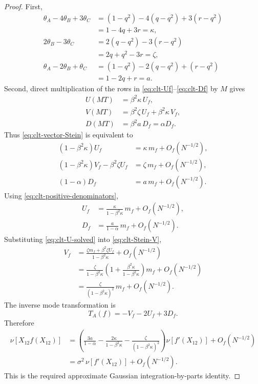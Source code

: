 \begin{proof}
First,
\begin{align*}
 \theta_A-4\theta_B+3\theta_C
 &=
 (1-q^2)-4(q-q^2)+3(r-q^2)\\
 &=1-4q+3r
 =\kappa,
\\
 2\theta_B-3\theta_C
 &=
 2(q-q^2)-3(r-q^2)\\
 &=2q+q^2-3r
 =\zeta,
\\
 \theta_A-2\theta_B+\theta_C
 &=
 (1-q^2)-2(q-q^2)+(r-q^2)\\
 &=1-2q+r
 =a.
\end{align*}
Second, direct multiplication of the rows in
\eqref{eq:clt-Uf}--\eqref{eq:clt-Df} by $M$ gives
\begin{align*}
 U(MT)
 &=\beta^2\kappa\,U_f,\\
 V(MT)
 &=\beta^2\zeta\,U_f+\beta^2\kappa\,V_f,\\
 D(MT)
 &=\beta^2a\,D_f
 =\alpha D_f.
\end{align*}
Thus \eqref{eq:clt-vector-Stein} is equivalent to
\begin{align}
 (1-\beta^2\kappa)U_f
 &=
 \kappa\,m_f+O_f(N^{-1/2}),
 \label{eq:clt-Stein-U}\\
 (1-\beta^2\kappa)V_f-\beta^2\zeta U_f
 &=
 \zeta\,m_f+O_f(N^{-1/2}),
 \label{eq:clt-Stein-V}\\
 (1-\alpha)D_f
 &=
 a\,m_f+O_f(N^{-1/2}).
 \label{eq:clt-Stein-D}
\end{align}
Using \eqref{eq:clt-positive-denominators},
\begin{align}
 U_f
 &=
 \frac{\kappa}{1-\beta^2\kappa}\,m_f
 +O_f(N^{-1/2}),
 \label{eq:clt-U-solved}\\
 D_f
 &=
 \frac{a}{1-\alpha}\,m_f
 +O_f(N^{-1/2}).
 \label{eq:clt-D-solved}
\end{align}
Substituting \eqref{eq:clt-U-solved} into
\eqref{eq:clt-Stein-V},
\begin{align*}
 V_f
 &=
 \frac{
 \zeta m_f+\beta^2\zeta U_f
 }{1-\beta^2\kappa}
 +O_f(N^{-1/2})
\\
 &=
 \frac{\zeta}{1-\beta^2\kappa}
 \left(
 1+
 \frac{\beta^2\kappa}{1-\beta^2\kappa}
 \right)m_f
 +O_f(N^{-1/2})
\\
 &=
 \frac{\zeta}{(1-\beta^2\kappa)^2}\,m_f
 +O_f(N^{-1/2}).
 \label{eq:clt-V-solved}
\end{align*}
The inverse mode transformation is
\begin{equation}
 T_A(f)=-V_f-2U_f+3D_f.
 \label{eq:clt-inverse-mode-A}
\end{equation}
Therefore
\begin{align}
 \nu[X_{12}f(X_{12})]
 &=
 \left(
 \frac{3a}{1-\alpha}
 -\frac{2\kappa}{1-\beta^2\kappa}
 -\frac{\zeta}{(1-\beta^2\kappa)^2}
 \right)
 \nu[f'(X_{12})]
 +O_f(N^{-1/2})
 \nonumber\\
 &=
 \sigma^2\,\nu[f'(X_{12})]
 +O_f(N^{-1/2}).
 \label{eq:clt-scalar-Stein}
\end{align}
This is the required approximate Gaussian integration-by-parts identity.


\end{proof}
